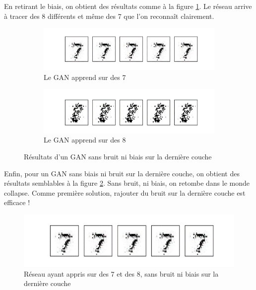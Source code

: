 En retirant le biais, on obtient des résultats comme à la figure \ref{fig:resultat_gan_bruit_sans_biais}. Le réseau arrive à tracer des 8 différents et même des 7 que l'on reconnaît clairement.

\begin{figure}[h!]
  \centering
  \begin{subfigure}[b]{\linewidth}
    \includegraphics[width=\linewidth]{fig/resultatgannibruitnibiais7.png}
    \caption{Le GAN apprend sur des 7}
  \end{subfigure}
  \quad
  \begin{subfigure}[b]{\linewidth}
    \includegraphics[width=\linewidth]{fig/resultatgannibruitnibiais8.png}
    \caption{Le GAN apprend sur des 8}
  \end{subfigure}
  \caption{Résultats d'un GAN sans bruit ni biais sur la dernière couche}
  \label{fig:resultat_gan_bruit_sans_biais}
\end{figure}

Enfin, pour un GAN sans biais ni bruit sur la dernière couche, on obtient des résultats semblables à la figure \ref{fig:resultat_gan_ni_bruit_ni_biais}. Sans bruit, ni biais, on retombe dans le monde collapse. Comme première solution, rajouter du bruit sur la dernière couche est efficace !

\begin{figure}[h]
  \centerline{\includegraphics[width=0.6\linewidth]{fig/resultatgannibruitnibiais.png}}
  \caption{Réseau ayant appris sur des 7 et des 8, sans bruit ni biais sur la dernière couche}
  \label{fig:resultat_gan_ni_bruit_ni_biais}
\end{figure}

